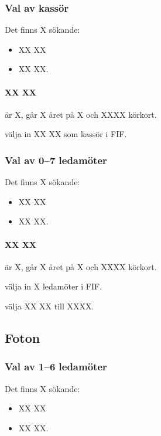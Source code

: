 \documentclass[hidelinks]{sektionsmote}
\begin{document}
\subsubsection{Val av kassör}
Det finns X sökande:
\begin{itemize}
    \item XX XX
    \item XX XX.
\end{itemize}

\paragraph{XX XX} är X, går X året på X och XXXX körkort.

\begin{beslut}
  \item välja in XX XX som kassör i FIF.
\end{beslut}


\subsubsection{Val av 0--7 ledamöter}
Det finns X sökande:
\begin{itemize}
    \item XX XX
    \item XX XX.
\end{itemize}

\paragraph{XX XX} är X, går X året på X och XXXX körkort.

\begin{beslut}
  \item välja in X ledamöter i FIF.
\end{beslut}
\begin{beslut}
  \item välja XX XX till XXXX.
\end{beslut}


\subsection{Foton}
\subsubsection{Val av 1--6 ledamöter}
Det finns X sökande:
\begin{itemize}
    \item XX XX
    \item XX XX.
\end{itemize}
\end{document}
